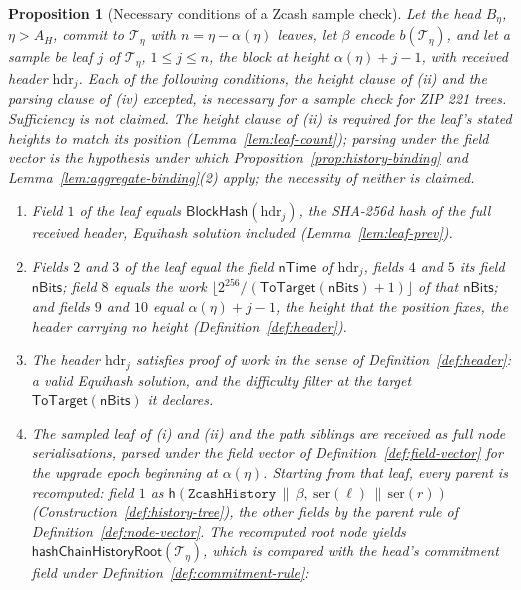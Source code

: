\documentclass[11pt,a4paper]{article}
\newtheorem{proposition}[theorem]{Proposition}
\theoremstyle{definition}
\begin{document}
\begin{proposition}[Necessary conditions of a Zcash sample check]
\label{prop:zcash-sample}
Let the head $B_\eta$, $\eta > A_H$, commit to $\mathcal{T}_\eta$ with
$n = \eta - \alpha(\eta)$ leaves, let $\beta$ encode $b(\mathcal{T}_\eta)$,
and let a sample be leaf $j$ of $\mathcal{T}_\eta$, $1 \le j \le n$, the
block at height $\alpha(\eta) + j - 1$, with received header
$\mathrm{hdr}_j$. Each of the following conditions, the height clause of (ii)
and the parsing clause of (iv) excepted, is necessary for a sample check for
ZIP 221 trees. Sufficiency is not claimed. The height clause of (ii) is
required for the leaf's stated heights to match its position
(Lemma~\ref{lem:leaf-count}); parsing under the field vector is the
hypothesis under which Proposition~\ref{prop:history-binding} and
Lemma~\ref{lem:aggregate-binding}(2) apply; the necessity of neither is
claimed.
\begin{enumerate}[label=(\roman*)]
\item Field $1$ of the leaf equals $\mathsf{BlockHash}(\mathrm{hdr}_j)$, the
  SHA-256d hash of the full received header, Equihash solution included
  (Lemma~\ref{lem:leaf-prev}).
\item Fields $2$ and $3$ of the leaf equal the field $\mathsf{nTime}$ of
  $\mathrm{hdr}_j$, fields $4$ and $5$ its field $\mathsf{nBits}$; field $8$
  equals the work $\lfloor 2^{256} / (\mathsf{ToTarget}(\mathsf{nBits}) + 1)
  \rfloor$ of that $\mathsf{nBits}$; and fields $9$ and $10$ equal
  $\alpha(\eta) + j - 1$, the height that the position fixes, the header
  carrying no height (Definition~\ref{def:header}).
\item The header $\mathrm{hdr}_j$ satisfies proof of work in the sense of
  Definition~\ref{def:header}: a valid Equihash solution, and the difficulty
  filter at the target $\mathsf{ToTarget}(\mathsf{nBits})$ it declares.
\item The sampled leaf of (i) and (ii) and the path siblings are received as
  full node serialisations, parsed under the field vector of
  Definition~\ref{def:field-vector} for the upgrade epoch beginning at
  $\alpha(\eta)$. Starting from that leaf, every parent is recomputed: field
  $1$ as $\mathsf{h}(\texttt{ZcashHistory} \,\|\, \beta,\
  \mathrm{ser}(\ell) \,\|\, \mathrm{ser}(r))$
  (Construction~\ref{def:history-tree}), the other fields by the parent rule
  of Definition~\ref{def:node-vector}. The recomputed root node yields
  $\mathsf{hashChainHistoryRoot}(\mathcal{T}_\eta)$, which is compared with
  the head's commitment field under Definition~\ref{def:commitment-rule}:

\end{enumerate}
\end{proposition}
\end{document}
